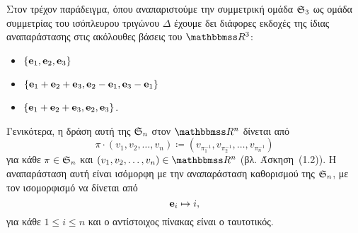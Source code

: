 \documentclass[12pt,a4paper,reqno]{amsart}
\begin{document}
Στον τρέχον παράδειγμα, όπου αναπαριστούμε την συμμετρική ομάδα $\mathfrak{S}_3$ ως ομάδα συμμετρίας του ισόπλευρου τριγώνου $\Delta$ έχουμε δει διάφορες εκδοχές της ίδιας αναπαράστασης στις ακόλουθες βάσεις του $\RR^3$:
\begin{itemize}
    \item $\{\mathbf{e}_1, \mathbf{e}_2, \mathbf{e}_3\}$
    \item $\{\mathbf{e}_1+\mathbf{e}_2+\mathbf{e}_3, \mathbf{e}_2-\mathbf{e}_1, \mathbf{e}_3-\mathbf{e}_1\}$
    \item $\{\mathbf{e}_1+\mathbf{e}_2+\mathbf{e}_3, \mathbf{e}_2, \mathbf{e}_3\}$.
\end{itemize}

Γενικότερα, η δράση αυτή της $\mathfrak{S}_n$ στον $\RR^n$ δίνεται από 
\[
\pi \cdot (v_1, v_2, \dots, v_n) \coloneqq (v_{\pi_1^{-1}}, v_{\pi_2^{-1}}, \dots, v_{\pi_n^{-1}})
\]
για κάθε $\pi \in \mathfrak{S}_n$ και $(v_1, v_2, \dots, v_n) \in \RR^n$ (βλ. Άσκηση~(1.2)). Η αναπαράσταση αυτή είναι ισόμορφη με την αναπαράσταση καθορισμού της $\mathfrak{S}_n$, με τον ισομορφισμό να δίνεται από 
\[
\mathbf{e}_i \mapsto i,
\]
για κάθε $1 \le i \le n$ και ο αντίστοιχος πίνακας είναι ο ταυτοτικός.
\end{document}
